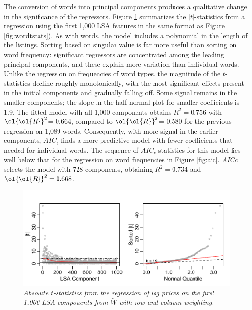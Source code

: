 \documentclass[12pt]{article}
\newcommand{\prs}{\mbox{$\ol{\ol{R}}^2$}}
\begin{document}
 The conversion of words into principal components produces a qualitative change in
 the significance of the regressors.  Figure \ref{fig:lsatstats} summarizes the
 $|t|$-statistics from a regression using the first 1,000 LSA  features
 in the same format as Figure \ref{fig:wordtstats}).  As with words, the model
 includes a polynomial in the length of the listings.   Sorting based on singular value is far more
 useful than sorting on word frequency:  significant regressors are concentrated among the leading principal components, and these explain more variation than individual words. Unlike the regression on
 frequencies of word types, the magnitude of the 
 $t$-statistics decline roughly monotonically, with the most
 significant effects present in the initial components and gradually falling
 off. Some signal remains in the smaller components; the slope in the
 half-normal plot for smaller coefficients is 1.9.  The fitted model with all 1,000 
 components obtains $R^2 = 0.756$
 with \prs = 0.664, compared to \prs = 0.580 for the previous regression on
 1,089 words.  Consequently, with more signal in the earlier components, $AIC_c$
 finds a more predictive model with fewer coefficients that needed for
 individual words.  The sequence of $AIC_c$ statistics for this model lies well
 below that for the regression on word frequencies in Figure \ref{fig:aic}.
  $AICc$ selects the model with 728 components, obtaining $R^2 = 0.734$
 and $\prs = 0.668$.
 
\begin{figure}
\caption{  \label{fig:lsatstats}  
  {\sl Absolute $t$-statistics from the regression of log prices on the first 1,000 LSA components from $\widetilde{W}$ with row and column weighting.}  }
  \centerline{ \includegraphics[width=5in]{figures/lsa_tstats.pdf} }
\end{figure}



 
\end{document}
